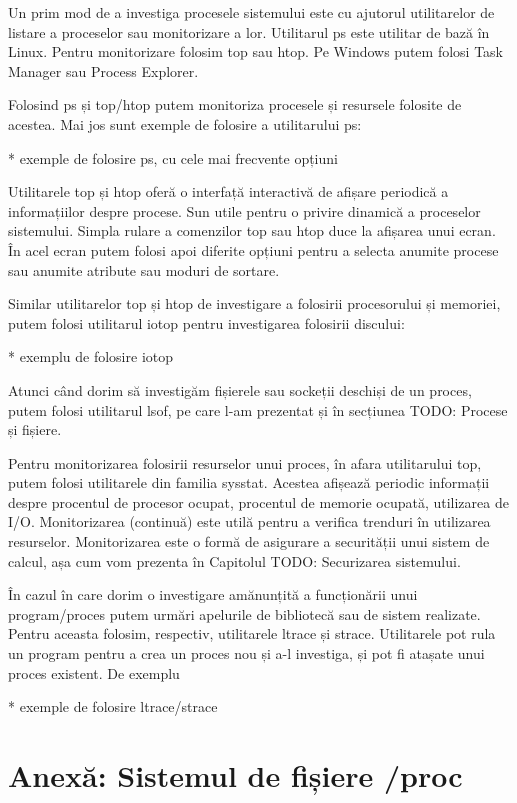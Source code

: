 Un prim mod de a investiga procesele sistemului este cu ajutorul utilitarelor de
listare a proceselor sau monitorizare a lor. Utilitarul ps este utilitar de bază
în Linux. Pentru monitorizare folosim top sau htop. Pe Windows putem folosi Task
Manager sau Process Explorer.

Folosind ps și top/htop putem monitoriza procesele și resursele folosite de
acestea. Mai jos sunt exemple de folosire a utilitarului ps:

* exemple de folosire ps, cu cele mai frecvente opțiuni

Utilitarele top și htop oferă o interfață interactivă de afișare periodică a
informațiilor despre procese. Sun utile pentru o privire dinamică a proceselor
sistemului. Simpla rulare a comenzilor top sau htop duce la afișarea unui ecran.
În acel ecran putem folosi apoi diferite opțiuni pentru a selecta anumite
procese sau anumite atribute sau moduri de sortare.

Similar utilitarelor top și htop de investigare a folosirii procesorului și
memoriei, putem folosi utilitarul iotop pentru investigarea folosirii discului:

* exemplu de folosire iotop

Atunci când dorim să investigăm fișierele sau sockeții deschiși de un proces,
putem folosi utilitarul lsof, pe care l-am prezentat și în secțiunea TODO:
Procese și fișiere.

Pentru monitorizarea folosirii resurselor unui proces, în afara utilitarului
top, putem folosi utilitarele din familia sysstat. Acestea afișează periodic
informații despre procentul de procesor ocupat, procentul de memorie ocupată,
utilizarea de I/O. Monitorizarea (continuă) este utilă pentru a verifica
trenduri în utilizarea resurselor. Monitorizarea este o formă de asigurare a
securității unui sistem de calcul, așa cum vom prezenta în Capitolul TODO:
Securizarea sistemului.

În cazul în care dorim o investigare amănunțită a funcționării unui
program/proces putem urmări apelurile de bibliotecă sau de sistem realizate.
Pentru aceasta folosim, respectiv, utilitarele ltrace și strace. Utilitarele pot
rula un program pentru a crea un proces nou și a-l investiga, și pot fi atașate
unui proces existent. De exemplu

* exemple de folosire ltrace/strace

\section{Anexă: Sistemul de fișiere /proc}


